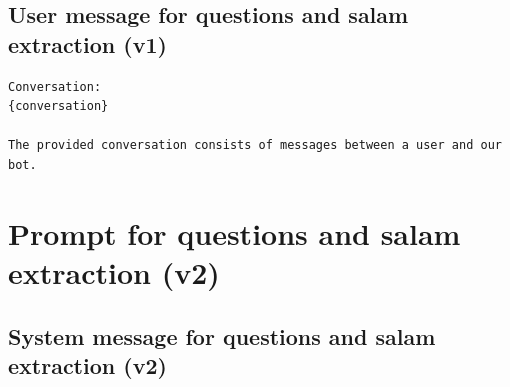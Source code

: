 \section{User message for questions and salam extraction (v1)}
\begin{verbatim}
Conversation: 
{conversation}
    
The provided conversation consists of messages between a user and our bot.

\end{verbatim}

\chapter{Prompt for questions and salam extraction (v2)}
\label{appex:prompt_for_extraction}

\section{System message for questions and salam extraction (v2)}
